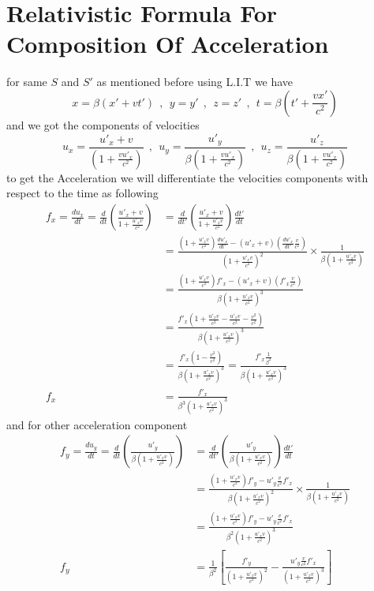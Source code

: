 \documentclass{article}
\begin{document}
\section{Relativistic Formula For Composition Of Acceleration}
for same $S$ and $S'$ as mentioned before using L.I.T we have 
\[
x= \beta(x'+vt') 
\ \ , \ \ 
y = y' 
\ \ , \ \ 
z = z' 
\ \ , \ \ 
t =\beta\left(t' + \frac{vx'}{c^2}\right)
\]
and we got the components of velocities
\[
u_x = \frac{u'_x + v}{\left(1 + \frac{vu'_x}{c^2}\right)}
\ \ , \ \ 
u_y = \frac{u'_y}{\beta\left(1 + \frac{vu'_x}{c^2}\right)}
\ \ , \ \ 
u_z = \frac{u'_z}{\beta\left(1 + \frac{vu'_x}{c^2}\right)}
\]
to get the Acceleration we will differentiate the velocities components with respect to the time as following
\begin{align*}
    f_x = \frac{du_x}{dt} = \frac{d}{dt}\left(\frac{u'_x+v}{1+\frac{u'_x v }{c^2}}\right)&= \frac{d}{dt'}\left(\frac{u'_x+v}{1+\frac{u'_x v }{c^2}}\right) \frac{dt'}{dt}\\
                          &= \frac{\left(1+\frac{u'_x v }{c^2}\right)\frac{du'_x}{dt'} - \left(u'_x+v\right)\left(\frac{du'_x}{dt'}\frac{v}{c^2}\right)}{{\left(1 + \frac{u'_x v}{c^2}\right)}^2} \times \frac{1}{\beta\left(1 + \frac{u'_x v}{c^2}\right)}\\
                          &= \frac{\left(1+\frac{u'_x v }{c^2}\right)f'_x - \left(u'_x+v\right)\left(f'_x\frac{v}{c^2}\right)}{\beta{\left(1 + \frac{u'_x v}{c^2}\right)}^3}\\
                          &= \frac{f'_x\left(1+\frac{u'_x v }{c^2} -\frac{u'_x v }{c^2} - \frac{v^2}{c^2}\right)}{\beta{\left(1 + \frac{u'_x v}{c^2}\right)}^3}\\
                          &= \frac{f'_x\left(1- \frac{v^2}{c^2}\right)}{\beta{\left(1 + \frac{u'_x v}{c^2}\right)}^3} = \frac{f'_x\frac{1}{\beta^2}}{\beta{\left(1 + \frac{u'_x v}{c^2}\right)}^3}\\
                      f_x &= \frac{f'_x}{\beta^3{\left(1 + \frac{u'_x v}{c^2}\right)}^3}
\end{align*}
and for other acceleration component
\begin{align*}
    f_y = \frac{du_y}{dt} = \frac{d}{dt}\left(\frac{u'_y}{\beta\left(1+\frac{u'_x v }{c^2}\right)}\right) &= \frac{d}{dt'}\left(\frac{u'_y}{\beta\left(1+\frac{u'_x v }{c^2}\right)}\right)\frac{dt'}{dt}\\
                          &= \frac{\left(1+\frac{u'_x v }{c^2}\right)f'_y - u'_y\frac{v}{c^2}f'_x}{{\beta\left(1 + \frac{u'_x v}{c^2}\right)}^2} \times \frac{1}{\beta\left(1 + \frac{u'_x v}{c^2}\right)}\\
                          &= \frac{\left(1+\frac{u'_x v }{c^2}\right)f'_y - u'_y\frac{v}{c^2}f'_x}{{\beta^2\left(1 + \frac{u'_x v}{c^2}\right)}^3}\\
                      f_y &=\frac{1}{\beta^2} \left[ \frac{f'_y}{{\left(1+\frac{u'_x v }{c^2}\right)}^2} - \frac{u'_y\frac{v}{c^2}f'_x}{{\left(1 + \frac{u'_x v}{c^2}\right)}^3}\right]
\end{align*}
\end{document}
